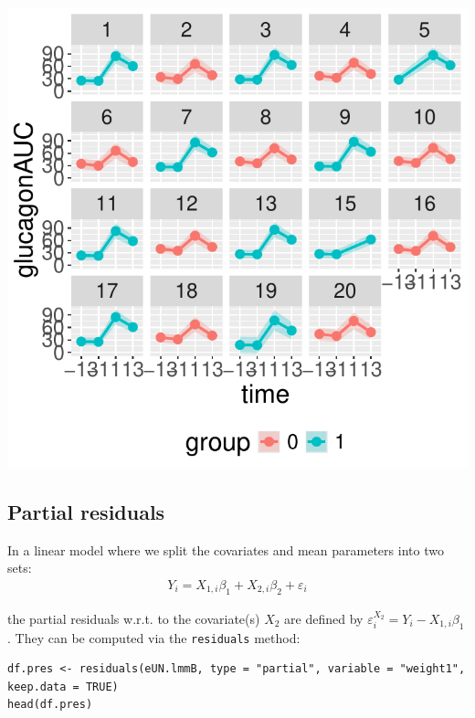 \documentclass[12pt]{article}
\begin{document}
\begin{minipage}{0.3\linewidth}
\begin{center}
\includegraphics[width=\textwidth]{./figures/fit-autoplot-indiv.pdf}
\end{center}
\end{minipage}

\clearpage

\subsection{Partial residuals}
\label{sec:orga26c8f7}

In a linear model where we split the covariates and mean parameters into two sets:
\begin{align*}
Y_i = X_{1,i} \beta_1 + X_{2,i} \beta_2 + \varepsilon_i
\end{align*}

\noindent the partial residuals w.r.t. to the covariate(s) \(X_2\) are defined
by \(\varepsilon^{X_2}_{i} = Y_i - X_{1,i} \beta_1\). \newline They can be
computed via the \texttt{residuals} method:
\lstset{language=r,label= ,caption= ,captionpos=b,numbers=none}
\begin{lstlisting}
df.pres <- residuals(eUN.lmmB, type = "partial", variable = "weight1", keep.data = TRUE)
head(df.pres)
\end{lstlisting}
\end{document}
